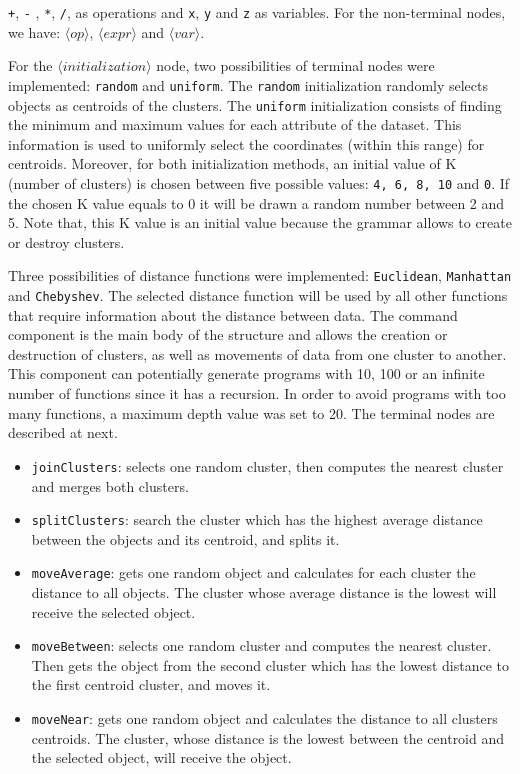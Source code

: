 \documentclass[conference]{IEEEtran}
\begin{document}
	
	\texttt{+}, \texttt{-} , \texttt{*}, \texttt{/}, as operations and \texttt{x}, \texttt{y} and \texttt{z} as variables. For the non-terminal nodes, we have: $\langle op \rangle$, $\langle expr \rangle$  and $\langle var \rangle$. 
	
	
	For the $\langle initialization \rangle$ node, two possibilities of terminal nodes were implemented: \texttt{random} and \texttt{uniform}. The \texttt{random} initialization randomly selects  objects as centroids of the clusters. The \texttt{uniform} initialization consists of finding the minimum and maximum values for each attribute of the dataset. This information is used to uniformly select the coordinates (within this range) for centroids. Moreover, for both initialization methods, an initial value of K (number of clusters) is chosen between five possible values: \texttt{4, 6, 8, 10} and \texttt{0}. If the chosen K value equals to 0 it will be drawn a random number between 2 and 5. Note that, this K value is an initial value because the grammar allows to create or destroy clusters. 
	
	
	Three possibilities of distance functions were implemented: \texttt{Euclidean}, \texttt{Manhattan} and \texttt{Chebyshev}. The selected distance function will be used by all other functions that require information about the distance between data. The command component is the main body of the structure and allows the creation or destruction of clusters, as well as movements of data from one cluster to another. This component can potentially generate programs with 10, 100 or an infinite number of functions since it has a recursion. In order to avoid programs with too many functions, a maximum depth value was set to 20. The terminal nodes are described at next.
	
	
	\begin{itemize}
		\item \texttt{joinClusters}:  selects one random cluster, then computes the nearest cluster and merges both clusters.
		\item \texttt{splitClusters}:  search the cluster which has the highest average distance between the objects and its centroid, and splits it. 
		\item \texttt{moveAverage}:   gets one random object and calculates for each cluster the distance to all objects. The cluster whose average distance is the lowest will receive the selected object.
		\item \texttt{moveBetween}:  selects one random cluster and computes the nearest cluster. Then gets the object from the second cluster which has the lowest distance to the first centroid cluster, and moves it.
		\item \texttt{moveNear}:   gets one random object and calculates the distance to all clusters centroids. The cluster, whose distance is the lowest between the centroid and the selected object, will receive the object.
	\end{itemize}
	
\end{document}
